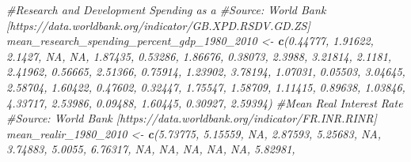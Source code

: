 \documentclass[11pt, oneside]{article}   	%
\newenvironment{Shaded}{\begin{snugshade}}{\end{snugshade}}
\newcommand{\CommentTok}[1]{\textcolor[rgb]{0.56,0.35,0.01}{\textit{#1}}}
\newcommand{\DecValTok}[1]{\textcolor[rgb]{0.00,0.00,0.81}{#1}}
\newcommand{\FloatTok}[1]{\textcolor[rgb]{0.00,0.00,0.81}{#1}}
\newcommand{\KeywordTok}[1]{\textcolor[rgb]{0.13,0.29,0.53}{\textbf{#1}}}
\newcommand{\NormalTok}[1]{#1}
\newcommand{\OtherTok}[1]{\textcolor[rgb]{0.56,0.35,0.01}{#1}}
\newcommand{\StringTok}[1]{\textcolor[rgb]{0.31,0.60,0.02}{#1}}
\begin{document}
\begin{Shaded}
\begin{Highlighting}[]
\CommentTok{#Research and Development Spending as a % of GDP}
\CommentTok{#Source: World Bank [https://data.worldbank.org/indicator/GB.XPD.RSDV.GD.ZS]}
\NormalTok{mean_research_spending_percent_gdp_}\DecValTok{1980}\NormalTok{_}\DecValTok{2010}\NormalTok{ <-}\StringTok{ }\KeywordTok{c}\NormalTok{(}\FloatTok{0.44777}\NormalTok{, }\FloatTok{1.91622}\NormalTok{, }\FloatTok{2.1427}\NormalTok{, }\OtherTok{NA}\NormalTok{, }\OtherTok{NA}\NormalTok{,}
                                                  \FloatTok{1.87435}\NormalTok{, }\FloatTok{0.53286}\NormalTok{, }\FloatTok{1.86676}\NormalTok{, }\FloatTok{0.38073}\NormalTok{,}
                                                  \FloatTok{2.3988}\NormalTok{, }\FloatTok{3.21814}\NormalTok{, }\FloatTok{2.1181}\NormalTok{, }\FloatTok{2.41962}\NormalTok{,}
                                                  \FloatTok{0.56665}\NormalTok{, }\FloatTok{2.51366}\NormalTok{, }\FloatTok{0.75914}\NormalTok{, }\FloatTok{1.23902}\NormalTok{,}
                                                  \FloatTok{3.78194}\NormalTok{, }\FloatTok{1.07031}\NormalTok{, }\FloatTok{0.05503}\NormalTok{, }\FloatTok{3.04645}\NormalTok{,}
                                                  \FloatTok{2.58704}\NormalTok{, }\FloatTok{1.60422}\NormalTok{, }\FloatTok{0.47602}\NormalTok{, }\FloatTok{0.32447}\NormalTok{,}
                                                  \FloatTok{1.75547}\NormalTok{, }\FloatTok{1.58709}\NormalTok{, }\FloatTok{1.11415}\NormalTok{, }\FloatTok{0.89638}\NormalTok{,}
                                                  \FloatTok{1.03846}\NormalTok{, }\FloatTok{4.33717}\NormalTok{, }\FloatTok{2.53986}\NormalTok{, }\FloatTok{0.09488}\NormalTok{,}
                                                  \FloatTok{1.60445}\NormalTok{, }\FloatTok{0.30927}\NormalTok{, }\FloatTok{2.59394}\NormalTok{)}
\CommentTok{#Mean Real Interest Rate}
\CommentTok{#Source: World Bank [https://data.worldbank.org/indicator/FR.INR.RINR]}
\NormalTok{mean_realir_}\DecValTok{1980}\NormalTok{_}\DecValTok{2010}\NormalTok{ <-}\StringTok{ }\KeywordTok{c}\NormalTok{(}\FloatTok{5.73775}\NormalTok{, }\FloatTok{5.15559}\NormalTok{, }\OtherTok{NA}\NormalTok{, }\FloatTok{2.87593}\NormalTok{, }\FloatTok{5.25683}\NormalTok{, }\OtherTok{NA}\NormalTok{, }\FloatTok{3.74883}\NormalTok{,}
                           \FloatTok{5.0055}\NormalTok{, }\FloatTok{6.76317}\NormalTok{, }\OtherTok{NA}\NormalTok{, }\OtherTok{NA}\NormalTok{, }\OtherTok{NA}\NormalTok{, }\OtherTok{NA}\NormalTok{, }\OtherTok{NA}\NormalTok{, }\FloatTok{5.82981}\NormalTok{,}
}
\end{Highlighting}
\end{Shaded}
\end{document}
